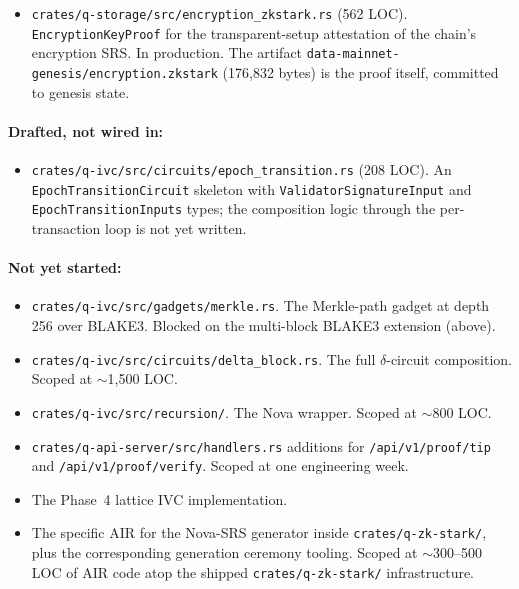\documentclass[11pt,a4paper]{article}
\begin{document}
\begin{itemize}[leftmargin=*]
        (548 LOC), \texttt{batch\_prover.rs} (662 LOC), \texttt{polynomials.rs}
        (549 LOC) for FRI-style polynomial commitments,
        \texttt{blockchain\_state\_circuit.rs} (410 LOC),
        \texttt{wallet\_privacy\_stark.rs} (530 LOC, deployed),
        \texttt{performance.rs} (591 LOC) for benchmark harness, and a
        \texttt{gpu/} subtree for hardware acceleration.
        Approximately 70--80\% of the STARK surface is shipped; what is
        missing is the specific AIR for the Nova-SRS generator
        (Section~\ref{sec:stark-setup}) and the AIR for batched Dilithium
        verification (Section~\ref{sec:stark-elsewhere}).
  \item \texttt{crates/q-storage/src/encryption\_zkstark.rs} (562 LOC).
        \texttt{EncryptionKeyProof} for the transparent-setup attestation
        of the chain's encryption SRS. In production. The artifact
        \texttt{data-mainnet-genesis/encryption.zkstark} (176{,}832 bytes)
        is the proof itself, committed to genesis state.
\end{itemize}

\paragraph{Drafted, not wired in:}
\begin{itemize}[leftmargin=*]
  \item \texttt{crates/q-ivc/src/circuits/epoch\_transition.rs} (208 LOC).
        An \texttt{EpochTransitionCircuit} skeleton with
        \texttt{ValidatorSignatureInput} and
        \texttt{EpochTransitionInputs} types; the composition logic
        through the per-transaction loop is not yet written.
\end{itemize}

\paragraph{Not yet started:}
\begin{itemize}[leftmargin=*]
  \item \texttt{crates/q-ivc/src/gadgets/merkle.rs}. The Merkle-path
        gadget at depth 256 over BLAKE3. Blocked on the multi-block
        BLAKE3 extension (above).
  \item \texttt{crates/q-ivc/src/circuits/delta\_block.rs}. The full
        $\delta$-circuit composition. Scoped at $\sim$1{,}500 LOC.
  \item \texttt{crates/q-ivc/src/recursion/}. The Nova wrapper.
        Scoped at $\sim$800 LOC.
  \item \texttt{crates/q-api-server/src/handlers.rs} additions for
        \texttt{/api/v1/proof/tip} and \texttt{/api/v1/proof/verify}.
        Scoped at one engineering week.
  \item The Phase~4 lattice IVC implementation.
  \item The specific AIR for the Nova-SRS generator inside
        \texttt{crates/q-zk-stark/}, plus the corresponding generation
        ceremony tooling. Scoped at $\sim$300--500 LOC of AIR code
        atop the shipped \texttt{crates/q-zk-stark/} infrastructure.
\end{itemize}
\end{document}
